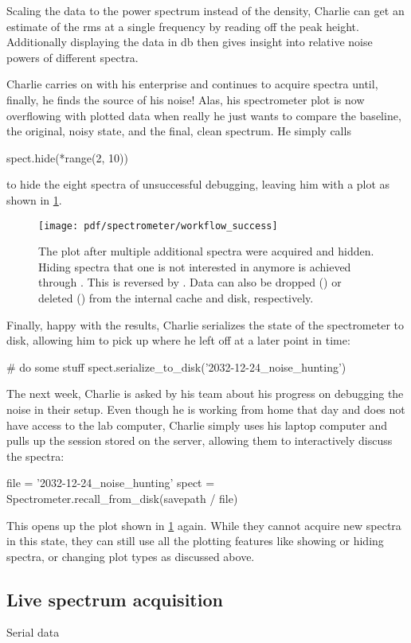 Scaling the data to the power spectrum instead of the density, Charlie can get an estimate of the \gls{rms} at a single frequency by reading off the peak height.
Additionally displaying the data in \unit{\decibel} then gives insight into relative noise powers of different spectra.

Charlie carries on with his enterprise and continues to acquire spectra until, finally, he finds the source of his noise!
Alas, his spectrometer plot is now overflowing with plotted data when really he just wants to compare the baseline, the original, noisy state, and the final, clean spectrum.
He simply calls
\begin{py}
spect.hide(*range(2, 10))
\end{py}
to hide the eight spectra of unsuccessful debugging, leaving him with a plot as shown in \cref{fig:speck:software:workflow_success}.

\begin{figure}
    \centering
    \texttt{[image: pdf/spectrometer/workflow\_success]}
    \caption{
        The \pyspeck plot after multiple additional spectra were acquired and hidden.
        Hiding spectra that one is not interested in anymore is achieved through .
        This is reversed by .
        Data can also be dropped () or deleted () from the internal cache and disk, respectively.
    }
    \label{fig:speck:software:workflow_success}
\end{figure}

Finally, happy with the results, Charlie serializes the state of the spectrometer to disk, allowing him to pick up where he left off at a later point in time:
\begin{py}
# do some stuff
spect.serialize_to_disk('2032-12-24_noise_hunting')
\end{py}
The next week, Charlie is asked by his team about his progress on debugging the noise in their setup.
Even though he is working from home that day and does not have access to the lab computer, Charlie simply uses his laptop computer and pulls up the  session stored on the server, allowing them to interactively discuss the spectra:
\begin{py}
file = '2032-12-24_noise_hunting'
spect = Spectrometer.recall_from_disk(savepath / file)
\end{py}
This opens up the plot shown in \cref{fig:speck:software:workflow_success} again.
While they cannot acquire new spectra in this state,
they can still use all the plotting features like showing or hiding spectra, or changing plot types as discussed above.

\subsection{Live spectrum acquisition}\label{subsec:speck:software:features:live_mode}
Serial data 

